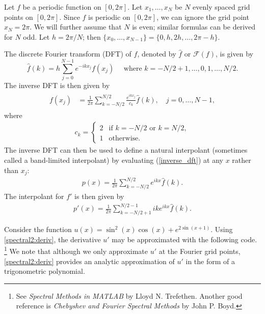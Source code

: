 \label{lab:pseudospectral2}


Let $f$ be a periodic function on $[0,2\pi]$.
Let $x_1,\ldots,x_N$ be $N$ evenly spaced grid points on $[0,2\pi]$.
Since $f$ is periodic on $[0,2\pi]$, we can ignore the grid point $x_N = 2\pi$.
We will further assume that $N$ is even; similar formulas can be derived for $N$ odd.
Let $h = 2\pi/N$; then $\{x_0,\ldots,x_{N-1}\} = \{0,h,2h,\ldots,2\pi-h\}$.  

The discrete Fourier transform (DFT) of $f$, denoted by $\hat{f}$ or $\mathcal{F}(f)$, is given by
\[
\hat{f}(k) = h \sum_{j=0}^{N-1} e^{-ikx_j}f(x_j) \quad \text{ where } k = -N/2+1, \ldots,0,1,\ldots, N/2.
\]
The inverse DFT is then given by
\begin{align}
\begin{split}
f(x_j) &= \frac{1}{2\pi}\sum_{k=-N/2}^{N/2}\frac{e^{ikx_j}}{c_k}\hat{f}(k), \quad j = 0,\ldots, N-1,
\end{split}\label{inverse_dft}
\end{align}
where
\begin{align}
	c_k = \begin{cases} 2 & \text{if }k = -N/2 \text{ or }k = N/2, \\ 1 &  \text{otherwise.}
\end{cases}
\end{align}
The inverse DFT can then be used to define a natural interpolant (sometimes called a band-limited interpolant) by evaluating (\ref{inverse_dft}) at any $x$ rather than $x_j$:
\begin{align}
p(x) = \frac{1}{2\pi}\sum_{k=-N/2}^{N/2} e^{ikx}\hat{f}(k). \label{interpolant}
\end{align}
The interpolant for $f'$ is then given by 
\begin{align}
p'(x) = \frac{1}{2\pi}\sum_{k=-N/2+1}^{N/2-1} ike^{ikx}\hat{f}(k). \label{spectral2:deriv}
\end{align}

Consider the function $u(x) = \sin^2 (x) \cos(x) +e^{2\sin(x+1)}$. 
Using \eqref{spectral2:deriv}, the derivative $u'$ may be approximated with the following code. 
\footnote{See \textit{Spectral Methods in MATLAB} by Lloyd N. Trefethen.
Another good reference is \textit{Chebyshev and Fourier Spectral Methods} by John P. Boyd.}
We note that although we only approximate $u'$ at the Fourier grid points, \eqref{spectral2:deriv} provides an analytic approximation of $u'$ in the form of a trigonometric polynomial.

